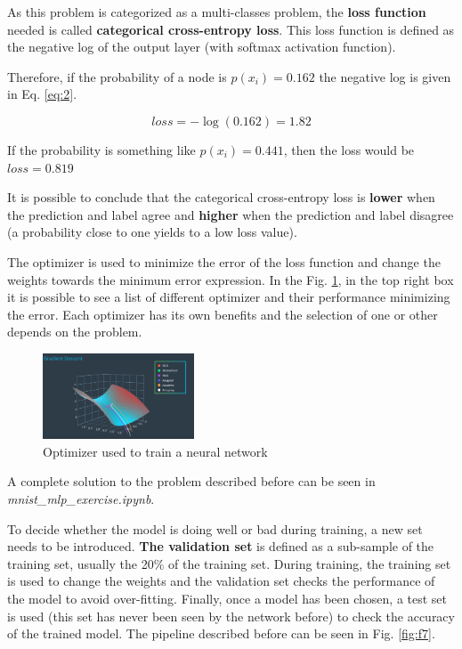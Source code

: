 \documentclass{article}
\begin{document}
As this problem is categorized as a multi-classes problem, the \textbf{loss function} needed is called \textbf{categorical cross-entropy loss}. This loss function is defined as the negative log of the output layer (with softmax activation function).

Therefore, if the probability of a node is \(p(x_i) = 0.162\) the negative log is given in Eq. \eqref{eq:2}.

\begin{equation}
loss = -\log(0.162) = 1.82 \label{eq:2}
\end{equation}

If the probability is something like \(p(x_i) = 0.441\), then the loss would be \(loss = 0.819\)

It is possible to conclude that the categorical cross-entropy loss is \textbf{lower} when the prediction and label agree and \textbf{higher} when the prediction and label disagree (a probability close to one yields to a low loss value).

The optimizer is used to minimize the error of the loss function and change the weights towards the minimum error expression. In the Fig. \ref{fig:f6}, in the top right box it is possible to see a list of different optimizer and their performance minimizing the error. Each optimizer has its own benefits and the selection of one or other depends on the problem.

\begin{figure}[ht]
    \centering
    \includegraphics[width=0.4\textwidth,height=0.4\textheight,keepaspectratio]{images/optimizer.png}
    \captionsetup{justification=centering}
    \caption{Optimizer used to train a neural network}
    \label{fig:f6}
\end{figure}

A complete solution to the problem described before can be seen in \textit{mnist\_mlp\_exercise.ipynb}.

To decide whether the model is doing well or bad during training, a new set needs to be introduced. \textbf{The validation set} is defined as a sub-sample of the training set, usually the 20\% of the training set. During training, the training set is used to change the weights and the validation set checks the performance of the model to avoid over-fitting. Finally, once a model has been chosen, a test set is used (this set has never been seen by the network before) to check the accuracy of the trained model. The pipeline described before can be seen in Fig. \ref{fig:f7}.
\end{document}
